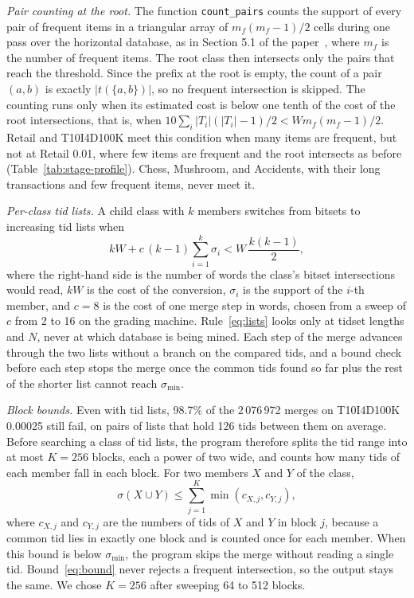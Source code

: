 \emph{Pair counting at the root.} The function \texttt{count\_pairs} counts the support
of every pair of frequent items in a triangular array of $m_f(m_f-1)/2$ cells during one
pass over the horizontal database, as in Section 5.1 of the paper~\cite{zaki2000}, where
$m_f$ is the number of frequent items. The root class then intersects only the pairs that
reach the threshold. Since the prefix at the root is empty, the count of a pair $(a, b)$
is exactly $|t(\{a, b\})|$, so no frequent intersection is skipped. The counting runs only
when its estimated cost is below one tenth of the cost of the root intersections, that
is, when
$10 \sum_i |T_i|(|T_i| - 1)/2 < W m_f(m_f-1)/2$. Retail and T10I4D100K meet this
condition when many items are frequent, but not at Retail 0.01, where few items are
frequent and the root intersects as before (Table~\ref{tab:stage-profile}). Chess,
Mushroom, and Accidents, with their long transactions and few frequent items, never meet
it.

\emph{Per-class tid lists.} A child class with $k$ members switches from bitsets to
increasing tid lists when
\begin{equation}
  kW + c\,(k - 1) \sum_{i=1}^{k} \sigma_i < W\,\frac{k(k-1)}{2},
  \label{eq:lists}
\end{equation}
where the right-hand side is the number of words the class's bitset intersections would
read, $kW$ is the cost of the conversion, $\sigma_i$ is the support of the $i$-th
member, and $c = 8$ is the cost of one merge step in words, chosen from a sweep of $c$
from 2 to 16 on the grading machine. Rule~\eqref{eq:lists} looks only at tidset lengths
and $N$, never at which database is being mined. Each step of the merge advances through the two
lists without a branch on the compared tids, and a bound check before each step stops the
merge once the common tids found so far plus the rest of the shorter list cannot reach
$\sigma_{\min}$.

\emph{Block bounds.} Even with tid lists, 98.7\% of the 2\,076\,972 merges on
T10I4D100K 0.00025 still fail, on pairs of lists that hold 126 tids between them on
average. Before searching a class of tid lists, the program therefore splits the tid range
into at most $K = 256$ blocks, each a power of two wide, and counts how many tids of each
member fall in each block. For two members $X$ and $Y$ of the class,
\begin{equation}
  \sigma(X \cup Y) \le \sum_{j=1}^{K} \min(c_{X,j}, c_{Y,j}),
  \label{eq:bound}
\end{equation}
where $c_{X,j}$ and $c_{Y,j}$ are the numbers of tids of $X$ and $Y$ in block $j$,
because a common tid lies in exactly one block and is counted once for each member. When
this bound is below $\sigma_{\min}$, the program skips the merge without reading a single
tid. Bound~\eqref{eq:bound} never rejects a frequent intersection, so the output stays the
same. We chose $K = 256$ after sweeping 64 to 512 blocks.

